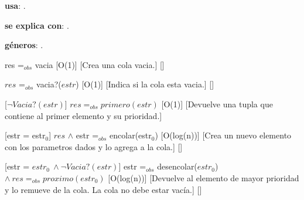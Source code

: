 \begin{Interfaz}

  \textbf{usa}: .
  
  \textbf{se explica con}: .

  \textbf{g\'eneros}: .


  {res =$_{obs}$ vacia}%
  [O(1)]
  [Crea una cola vacia.]
  []

  {$res$ =$_{obs}$ vacia?($estr$)}%
  [O(1)]
  [Indica si la cola esta vacia.]
  []

  [$\neg Vacia?(estr)$]
  {$res =_{obs} primero(estr)$}%
  [O(1)]
  [Devuelve una tupla que contiene al primer elemento y su prioridad.]
  

  [estr = estr$_0$]
  {$res$ $\wedge$ estr =$_{obs}$ encolar(estr$_0$)}%
  [O(log(n))]
  [Crea un nuevo elemento con los parametros dados y lo agrega a la cola.]
  []

  [estr = $estr_0 \ \wedge \neg Vacia?(estr)$] 
  {estr =$_{obs}$ desencolar($estr_0$) $\wedge \ res =_{obs} proximo(estr_0)$}%
  [O(log(n))]
  [Devuelve al elemento de mayor prioridad y lo remueve de la cola. La cola no debe estar vac\'ia.]
  []
  
  
\end{Interfaz}
